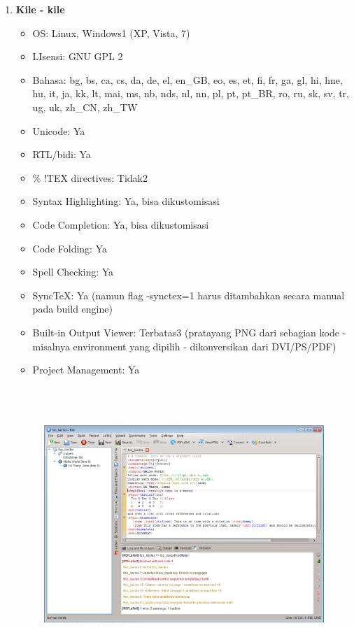 \begin{enumerate}
\item \textbf{Kile - kile}
\begin{itemize}
\item OS: Linux, Windows1 (XP, Vista, 7)
\item LIsensi: GNU GPL 2
\item Bahasa: bg, bs, ca, cs, da, de, el, en\_GB, eo, es, et, fi, fr, ga, gl, hi, hne, hu, it, ja, kk, lt, mai, ms, nb, nds, nl, nn, pl, pt, pt\_BR, ro, ru, sk, sv, tr, ug, uk, zh\_CN, zh\_TW
\item Unicode: Ya
\item RTL/bidi: Ya
\item \% !TEX directives: Tidak2
\item Syntax Highlighting: Ya, bisa dikustomisasi
\item Code Completion: Ya, bisa dikustomisasi
\item Code Folding: Ya
\item Spell Checking: Ya
\item SyncTeX: Ya (namun flag -synctex=1 harus ditambahkan secara manual pada build engine)
\item Built-in Output Viewer: Terbatas3 (pratayang PNG dari sebagian kode - misalnya environment yang dipilih - dikonversikan dari DVI/PS/PDF)
\item Project Management: Ya
\end{itemize}
\begin{figure}[ht]

\includegraphics[width=14.76cm,height=10.39cm]{gambar/image6.jpg}
\end{figure}



\end{enumerate}
